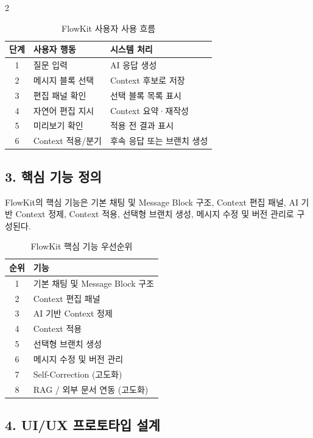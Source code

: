\documentclass[10pt, a4paper]{article}
\begin{document}
\begin{multicols}{2}
\begin{table}[H]
\centering
\caption{FlowKit 사용자 사용 흐름}
\label{tab:flow}
\small
\begin{tabularx}{\columnwidth}{@{} c X X @{}}
\toprule
\textbf{단계} & \textbf{사용자 행동} & \textbf{시스템 처리} \\
\midrule
1 & 질문 입력          & AI 응답 생성          \\
2 & 메시지 블록 선택      & Context 후보로 저장    \\
3 & 편집 패널 확인       & 선택 블록 목록 표시      \\
4 & 자연어 편집 지시      & Context 요약·재작성    \\
5 & 미리보기 확인        & 적용 전 결과 표시       \\
6 & Context 적용/분기   & 후속 응답 또는 브랜치 생성  \\
\bottomrule
\end{tabularx}
\end{table}

\subsection*{3. 핵심 기능 정의}

FlowKit의 핵심 기능은 기본 채팅 및 Message Block 구조, Context 편집 패널, AI 기반 Context 정제, Context 적용, 선택형 브랜치 생성, 메시지 수정 및 버전 관리로 구성된다.

\begin{table}[H]
\centering
\caption{FlowKit 핵심 기능 우선순위}
\label{tab:features}
\small
\begin{tabularx}{\columnwidth}{@{} c X @{}}
\toprule
\textbf{순위} & \textbf{기능} \\
\midrule
1 & 기본 채팅 및 Message Block 구조 \\
2 & Context 편집 패널 \\
3 & AI 기반 Context 정제 \\
4 & Context 적용 \\
5 & 선택형 브랜치 생성 \\
6 & 메시지 수정 및 버전 관리 \\
7 & Self-Correction (고도화) \\
8 & RAG / 외부 문서 연동 (고도화) \\
\bottomrule
\end{tabularx}
\end{table}

\subsection*{4. UI/UX 프로토타입 설계}


\end{multicols}
\end{document}
